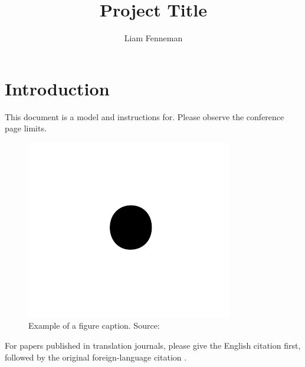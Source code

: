 \documentclass[conference]{IEEEtran}
\begin{document}
\title{Project Title}
\author{Liam Fenneman}

\maketitle


\section{Introduction}

This document is a model and instructions for. Please observe the conference
page limits. 

\begin{figure}[htbp]
    \centerline{\includegraphics{images/fig1}}
    \caption{Example of a figure caption. Source: \cite{example}}
    \label{fig:example}
\end{figure}

For papers published in translation journals, please give the English citation
first, followed by the original foreign-language citation \cite{example}.



\end{document}
